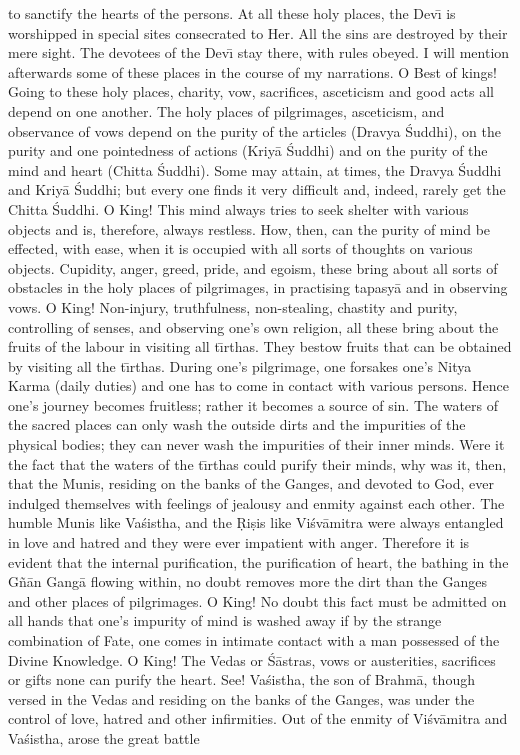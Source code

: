 to sanctify the hearts of the persons. At all these holy places, the Dev\={\i} is worshipped in special sites consecrated to Her. All the sins are destroyed by their mere sight. The devotees of the Dev\={\i} stay there, with rules obeyed. I will mention afterwards some of these places in the course of my narrations. O Best of kings! Going to these holy places, charity, vow, sacrifices, asceticism and good acts all depend on one another. The holy places of pilgrimages, asceticism, and observance of vows depend on the purity of the articles (Dravya \'Suddhi), on the purity and one pointedness of actions (Kriy\=a \'Suddhi) and on the purity of the mind and heart (Chitta \'Suddhi). Some may attain, at times, the Dravya \'Suddhi and Kriy\=a \'Suddhi; but every one finds it very difficult and, indeed, rarely get the Chitta \'Suddhi. O King! This mind always tries to seek shelter with various objects and is, therefore, always restless. How, then, can the purity of mind be effected, with ease, when it is occupied with all sorts of thoughts on various objects. Cupidity, anger, greed, pride, and egoism, these bring about all sorts of obstacles in the holy places of pilgrimages, in practising tapasy\=a and in observing vows. O King! Non-injury, truthfulness, non-stealing, chastity and purity, controlling of senses, and observing one's own religion, all these bring about the fruits of the labour in visiting all t\={\i}rthas. They bestow fruits that can be obtained by visiting all the t\={\i}rthas. During one's pilgrimage, one forsakes one's Nitya Karma (daily duties) and one has to come in contact with various persons. Hence one's journey becomes fruitless; rather it becomes a source of sin. The waters of the sacred places can only wash the outside dirts and the impurities of the physical bodies; they can never wash the impurities of their inner minds. Were it the fact that the waters of the t\={\i}rthas could purify their minds, why was it, then, that the Munis, residing on the banks of the Ganges, and devoted to God, ever indulged themselves with feelings of jealousy and enmity against each other. The humble Munis like Va\'sistha, and the \d{R}i\d{s}is like Vi\'sv\=amitra were always entangled in love and hatred and they were ever impatient with anger. Therefore it is evident that the internal purification, the purification of heart, the bathing in the G\~n\=an Gang\=a flowing within, no doubt removes more the dirt than the Ganges and other places of pilgrimages. O King! No doubt this fact must be admitted on all hands that one's impurity of mind is washed away if by the strange combination of Fate, one comes in intimate contact with a man possessed of the Divine Knowledge. O King! The Vedas or \'S\=astras, vows or austerities, sacrifices or gifts none can purify the heart. See! Va\'sistha, the son of Brahm\=a, though versed in the Vedas and residing on the banks of the Ganges, was under the control of love, hatred and other infirmities. Out of the enmity of Vi\'sv\=amitra and Va\'sistha, arose the great battle

